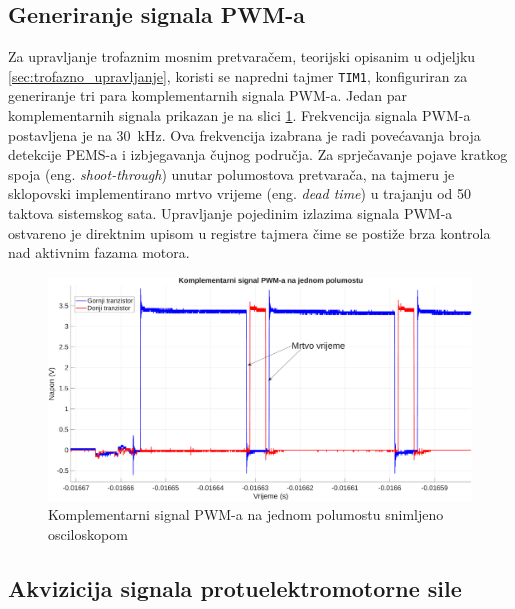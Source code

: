 \documentclass[diplomskirad, upload]{fer}
\begin{document}
\subsection{Generiranje signala PWM-a}
\label{ssec:generiranje_pwm}

Za upravljanje trofaznim mosnim pretvaračem, teorijski opisanim u odjeljku
\ref{sec:trofazno_upravljanje}, koristi se napredni tajmer \texttt{TIM1},
konfiguriran za generiranje tri para komplementarnih signala PWM-a. Jedan par
komplementarnih signala prikazan je na slici \ref{fig:comp_scope}. Frekvencija
signala PWM-a postavljena je na \SI{30}{\kilo\hertz}. Ova frekvencija izabrana
je radi povećavanja broja detekcije PEMS-a i izbjegavanja čujnog područja. Za
sprječavanje pojave kratkog spoja (eng. \textit{shoot-through}) unutar
polumostova pretvarača, na tajmeru je sklopovski implementirano mrtvo vrijeme
(eng. \textit{dead time}) u trajanju od 50 taktova sistemskog sata. Upravljanje
pojedinim izlazima signala PWM-a ostvareno je direktnim upisom u registre
tajmera čime se postiže brza kontrola nad aktivnim fazama motora.
\begin{figure}[h!]
	\centering
	\includegraphics[width=\textwidth]{csv/comp.pdf}
	\caption{Komplementarni signal PWM-a na jednom polumostu snimljeno osciloskopom}
	\label{fig:comp_scope}
\end{figure}

\subsection{Akvizicija signala protuelektromotorne sile}
\label{ssec:akvizicija_pems}
\end{document}
